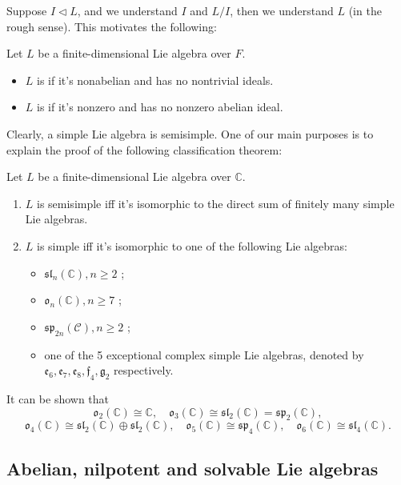 Suppose $I\lhd L$, and we understand $I$ and $L / I$, then we understand $L$ (in
the rough sense). This motivates the following:
\begin{definition}
	Let $L$ be a finite-dimensional Lie algebra over $F$.
	\begin{itemize}
		\item $L$ is  if it's nonabelian and has no nontrivial ideals.
		\item  $L$ is  if it's nonzero and has no nonzero abelian
			ideal.
	\end{itemize}
\end{definition}
Clearly, a simple Lie algebra is semisimple.
One of our main purposes is to explain the proof of the following classification
theorem:
\begin{theorem}
    Let $L$ be a finite-dimensional Lie algebra over $\mathbb{C}$.
	\begin{enumerate}[(1)]
		\item $L$ is semisimple iff it's isomorphic to the direct sum of
			finitely many simple Lie algebras.
		\item $L$ is simple iff it's isomorphic to one of the following Lie algebras:
			\begin{itemize}
				\item $\mathfrak{sl}_n(\mathbb{C}), n\ge 2$ ;
				\item $\mathfrak{o}_n(\mathbb{C}), n\ge 7$ ;
				\item $\mathfrak{sp}_{2n}(\mathcal{C}), n\ge 2$ ;
				\item one of the 5 exceptional complex simple Lie algebras,
					denoted by $\mathfrak{e}_6, \mathfrak{e}_7, \mathfrak{e}_8,
					\mathfrak{f}_4, \mathfrak{g}_2$ respectively.
			\end{itemize}
	\end{enumerate}
\end{theorem}
\begin{remark}
    It can be shown that
	\[
	\mathfrak{o}_2(\mathbb{C}) \cong \mathbb{C}, \quad
	\mathfrak{o}_3(\mathbb{C})\cong \mathfrak{sl}_2(\mathbb{C})
	= \mathfrak{sp}_2(\mathbb{C}),
	\]
	\[
	\mathfrak{o}_4(\mathbb{C}) \cong \mathfrak{sl}_2(\mathbb{C})
	\oplus \mathfrak{sl}_2(\mathbb{C}), \quad
	\mathfrak{o}_5(\mathbb{C})\cong \mathfrak{sp}_4(\mathbb{C}),
	\quad \mathfrak{o}_6(\mathbb{C}) \cong \mathfrak{sl}_4(\mathbb{C}).
	\]
\end{remark}

\subsection{Abelian, nilpotent and solvable Lie algebras}
\label{sub:ad-semisimple, nilpotent Lie algebras}

